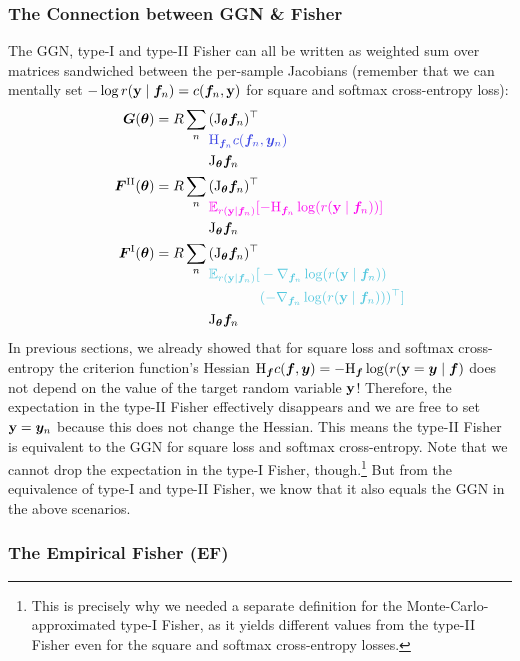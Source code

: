 \subsubsection{The Connection between GGN \& Fisher}
The GGN, type-I and type-II Fisher can all be written as weighted sum over matrices sandwiched between the per-sample Jacobians (remember that we can mentally set $-\log r({\mathbf{y}} \mid {\bm{f}}_n) = c({\bm{f}}_n, {\mathbf{y}})$ for square and softmax cross-entropy loss):
\begin{align*}
  \mG(\vtheta)
   & =
  R \sum_n
  \begin{aligned}[t]
     & (\jac_{\vtheta}\vf_n)^\top                           \\
     & \textcolor{VectorBlue}{\hess_{\vf_n}c(\vf_n, \vy_n)} \\
     & \jac_{\vtheta}\vf_n
  \end{aligned}
  \\
  \mF^{\text{II}}(\vtheta)
   & =
  R \sum_n
  \begin{aligned}[t]
     & (\jac_{\vtheta}\vf_n)^\top                                                                 \\
     & \textcolor{VectorPink}{\E_{r(\rvy \mid \vf_n)}[-\hess_{\vf_n} \log( r(\rvy \mid \vf_n)) ]} \\
     & \jac_{\vtheta}\vf_n
  \end{aligned}
  \\
  \mF^{\text{I}}(\vtheta)
   & =
  R \sum_n
  \begin{aligned}[t]
     & (\jac_{\vtheta}\vf_n)^\top                          \\
     & \textcolor{VectorTeal}{\E_{r(\rvy \mid \vf_n)}[
    \begin{aligned}[t]
       & -\nabla_{\vf_n} \log( r(\rvy \mid \vf_n))           \\
       & (-\nabla_{\vf_n} \log( r(\rvy \mid \vf_n)))^{\top}]
    \end{aligned}} \\
     & \jac_{\vtheta}\vf_n
  \end{aligned}
\end{align*}
In previous sections, we already showed that for square loss and softmax cross-entropy the criterion function's Hessian $\mathrm{H}_{\bm{f}} c({\bm{f}}, {\bm{y}}) = -\mathrm{H}_{{\bm{f}}} \log( r({\mathbf{y}} = {\bm{y}} \mid {\bm{f}})$ does not depend on the value of the target random variable ${\mathbf{y}}$!
Therefore, the expectation in the type-II Fisher effectively disappears and we are free to set ${\mathbf{y}} = {\bm{y}}_n$ because this does not change the Hessian.
This means the type-II Fisher is equivalent to the GGN for square loss and softmax cross-entropy.
Note that we cannot drop the expectation in the type-I Fisher, though.\footnote{This is precisely why we needed a separate definition for the Monte-Carlo-approximated type-I Fisher,
as it yields different values from the type-II Fisher even for the square and softmax cross-entropy losses.}
But from the equivalence of type-I and type-II Fisher, we know that it also equals the GGN in the above scenarios.

\subsubsection{The Empirical Fisher (EF)}\label{sec:emp_fisher}


